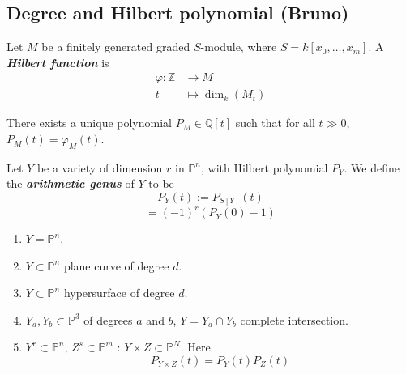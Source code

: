 \subsection{Degree and Hilbert polynomial (Bruno)}


\begin{defn}
	Let $M$ be a finitely generated graded $S$-module, where $S=k[x_0,\ldots,x_m]$. A \textit{\textbf{Hilbert function}} is
	\begin{align*}
		\varphi: \mathbb{Z} &\longrightarrow M \\
		t &\longmapsto \dim_k(M_t)
	\end{align*}
\end{defn}

\begin{thm}
	There exists a unique polynomial $P_M\in\mathbb{Q}[t]$ such that for all $t\gg 0$, $P_M(t)=\varphi_M(t)$.
\end{thm}

\begin{manualexercise}{7.2}
	Let $Y$ be a variety of dimension $r$ in $\mathbb{P}^n$, with Hilbert polynomial $P_Y$. We define the \textit{\textbf{arithmetic genus}} of $Y$ to be
	\[P_Y(t):=P_{S[Y]}(t)\]
	\[=(-1)^r(P_Y(0)-1)\]
	\begin{enumerate}[label=\alph*.]
		\item  $Y=\mathbb{P}^n$.
		\item $Y\subset \mathbb{P}^n$ plane curve of degree $d$.
		\item $ Y\subset \mathbb{P}^n$ hypersurface of degree $d$.
		\item $Y_a,Y_b\subset \mathbb{P}^3$ of degrees $a$ and $b$, $Y =Y_a\cap Y_b$ complete intersection.
		\item $Y^r\subset \mathbb{P}^n$, $Z^s\subset \mathbb{P}^m$ : $Y\times Z\subset \mathbb{P}^N$. Here
			\[P_{Y\times Z}(t)=P_Y(t)P_Z(t)\]
	\end{enumerate}
\end{manualexercise}

